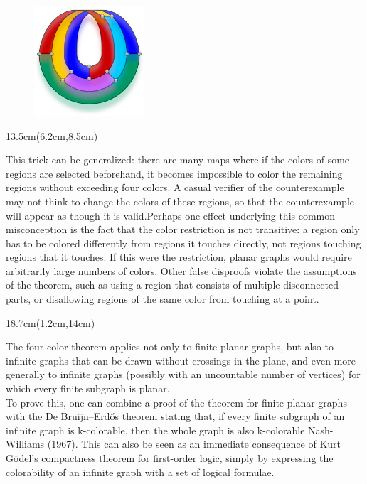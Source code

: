 \documentclass[11pt,a4paper,twoside]{book}
\newenvironment{positionedparagraph}[4]{%
	\begin{textblock*}{#1}(#2,#3)
		\noindent\textbf{#4}\par\medskip
	}{%
	\end{textblock*}
}
\begin{document}
\begin{figure}[htbp]
	\vspace{1.5cm}
	\hspace{1cm}
	\begin{minipage}{0.45\textwidth}
		\includegraphics[width=4.1cm]{myimages/pic8.png}
	\end{minipage}
\end{figure}
\begin{positionedparagraph}{13.5cm}{6.2cm}{8.5cm}
	\
	\noindent
	This trick can be generalized: there are many maps where if the colors of some regions are selected beforehand, it becomes impossible to color the remaining regions without exceeding four colors. A casual verifier of the counterexample may not think to change the colors of these regions, so that the counterexample will appear as though it is valid.Perhaps one effect underlying this common misconception is the fact that the color restriction is not transitive: a region only has to be colored differently from regions it touches directly, not regions touching regions that it touches. If this were the restriction, planar graphs would require arbitrarily large numbers of colors. Other false disproofs violate the assumptions of the theorem, such as using a region that consists of multiple disconnected parts, or disallowing regions of the same color from touching at a point. 
\end{positionedparagraph}
\begin{positionedparagraph}{18.7cm}{1.2cm}{14cm}
	\
	\noindent
	The four color theorem applies not only to finite planar graphs, but also to infinite graphs that can be drawn without crossings in the plane, and even more generally to infinite graphs (possibly with an uncountable number of vertices) for which every finite subgraph is planar. 
	\newline\\[-0.3cm]
	To prove this, one can combine a proof of the theorem for finite planar graphs with the De Bruijn–Erdős theorem stating that, if every finite subgraph of an infinite graph is k-colorable, then the whole graph is also k-colorable Nash-Williams (1967). This can also be seen as an immediate consequence of Kurt Gödel's compactness theorem for first-order logic, simply by expressing the colorability of an infinite graph with a set of logical formulae.
\end{positionedparagraph}
\end{document}
